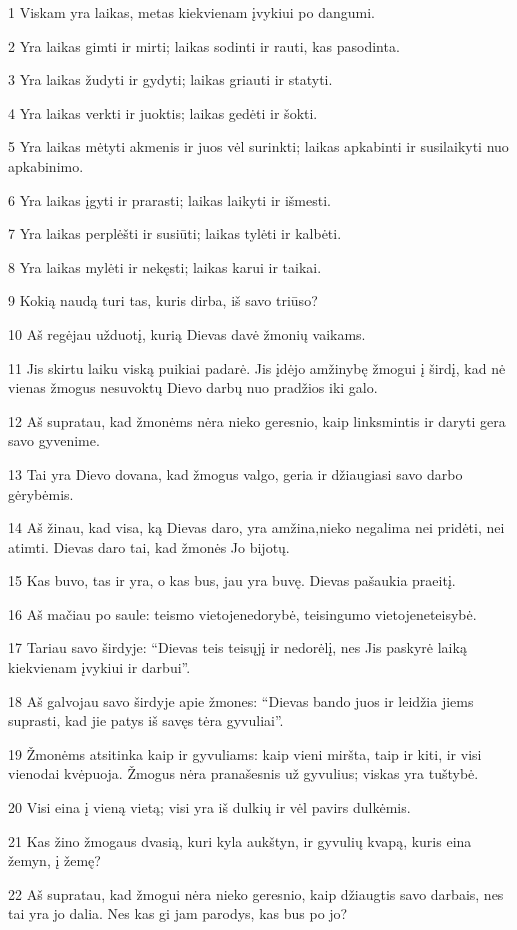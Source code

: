 \par 1 Viskam yra laikas, metas kiekvienam įvykiui po dangumi. 
\par 2 Yra laikas gimti ir mirti; laikas sodinti ir rauti, kas pasodinta. 
\par 3 Yra laikas žudyti ir gydyti; laikas griauti ir statyti. 
\par 4 Yra laikas verkti ir juoktis; laikas gedėti ir šokti. 
\par 5 Yra laikas mėtyti akmenis ir juos vėl surinkti; laikas apkabinti ir susilaikyti nuo apkabinimo. 
\par 6 Yra laikas įgyti ir prarasti; laikas laikyti ir išmesti. 
\par 7 Yra laikas perplėšti ir susiūti; laikas tylėti ir kalbėti. 
\par 8 Yra laikas mylėti ir nekęsti; laikas karui ir taikai. 
\par 9 Kokią naudą turi tas, kuris dirba, iš savo triūso? 
\par 10 Aš regėjau užduotį, kurią Dievas davė žmonių vaikams. 
\par 11 Jis skirtu laiku viską puikiai padarė. Jis įdėjo amžinybę žmogui į širdį, kad nė vienas žmogus nesuvoktų Dievo darbų nuo pradžios iki galo. 
\par 12 Aš supratau, kad žmonėms nėra nieko geresnio, kaip linksmintis ir daryti gera savo gyvenime. 
\par 13 Tai yra Dievo dovana, kad žmogus valgo, geria ir džiaugiasi savo darbo gėrybėmis. 
\par 14 Aš žinau, kad visa, ką Dievas daro, yra amžina,­nieko negalima nei pridėti, nei atimti. Dievas daro tai, kad žmonės Jo bijotų. 
\par 15 Kas buvo, tas ir yra, o kas bus, jau yra buvę. Dievas pašaukia praeitį. 
\par 16 Aš mačiau po saule: teismo vietoje­nedorybė, teisingumo vietoje­neteisybė. 
\par 17 Tariau savo širdyje: “Dievas teis teisųjį ir nedorėlį, nes Jis paskyrė laiką kiekvienam įvykiui ir darbui”. 
\par 18 Aš galvojau savo širdyje apie žmones: “Dievas bando juos ir leidžia jiems suprasti, kad jie patys iš savęs tėra gyvuliai”. 
\par 19 Žmonėms atsitinka kaip ir gyvuliams: kaip vieni miršta, taip ir kiti, ir visi vienodai kvėpuoja. Žmogus nėra pranašesnis už gyvulius; viskas yra tuštybė. 
\par 20 Visi eina į vieną vietą; visi yra iš dulkių ir vėl pavirs dulkėmis. 
\par 21 Kas žino žmogaus dvasią, kuri kyla aukštyn, ir gyvulių kvapą, kuris eina žemyn, į žemę? 
\par 22 Aš supratau, kad žmogui nėra nieko geresnio, kaip džiaugtis savo darbais, nes tai yra jo dalia. Nes kas gi jam parodys, kas bus po jo?



